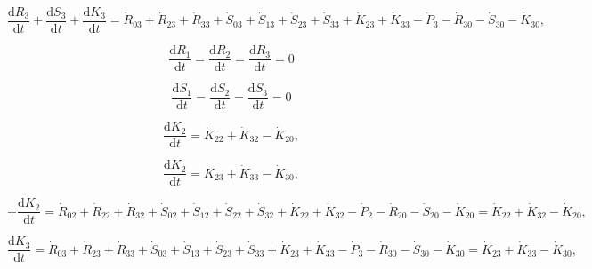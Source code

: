  \begin{equation} \label{eq:C-CV_R_dot_3}
 	\frac{\mathrm{d}R_{3}}{\mathrm{d}t} 
	+ \frac{\mathrm{d}S_{3}}{\mathrm{d}t}
 	+ \frac{\mathrm{d}K_{3}}{\mathrm{d}t}
 	=  \dot{R}_{03} + \dot{R}_{23} + \dot{R}_{33}
 	+ \dot{S}_{03} + \dot{S}_{13} + \dot{S}_{23} + \dot{S}_{33} 
 	+ \dot{K}_{23} + \dot{K}_{33}
 	- \dot{P}_{3}
 	- \dot{R}_{30} 
 	- \dot{S}_{30} 
 	- \dot{K}_{30},
 \end{equation}

\begin{equation}\label{eq:C-dR_dt_zero}
	\frac{\mathrm{d}R_{1}}{\mathrm{d}t} = \frac{\mathrm{d}R_{2}}{\mathrm{d}t} = \frac{\mathrm{d}R_{3}}{\mathrm{d}t} = 0
\end{equation}

\begin{equation}\label{eq:C-dS_dt_zero}
	\frac{\mathrm{d}S_{1}}{\mathrm{d}t} = \frac{\mathrm{d}S_{2}}{\mathrm{d}t} = \frac{\mathrm{d}S_{3}}{\mathrm{d}t} = 0
\end{equation}

\begin{equation} \label{eq:C-CV_K_dot_2}
	\frac{\mathrm{d}K_{2}}{\mathrm{d}t}
	=  \dot{K}_{22} + \dot{K}_{32} 
	- \dot{K}_{20},
\end{equation}

\begin{equation} \label{eq:C-CV_K_dot_3}
	\frac{\mathrm{d}K_{2}}{\mathrm{d}t}
	=  \dot{K}_{23} + \dot{K}_{33} 
	- \dot{K}_{30},
\end{equation}
 
 \begin{equation} \label{eq:C-CV_R_dot_2b}
 	+ \frac{\mathrm{d}K_{2}}{\mathrm{d}t}
 	=  \dot{R}_{02} + \dot{R}_{22} + \dot{R}_{32}
 	+ \dot{S}_{02} + \dot{S}_{12} + \dot{S}_{22} + \dot{S}_{32} 
 	+ \dot{K}_{22} + \dot{K}_{32}
 	- \dot{P}_{2}
 	- \dot{R}_{20} 
 	- \dot{S}_{20} 
 	- \dot{K}_{20}
	=  \dot{K}_{22} + \dot{K}_{32} 
	- \dot{K}_{20},
 \end{equation}
 
 \begin{equation} \label{eq:C-CV_R_dot_3}
 	\frac{\mathrm{d}K_{3}}{\mathrm{d}t}
 	=  \dot{R}_{03} + \dot{R}_{23} + \dot{R}_{33}
 	+ \dot{S}_{03} + \dot{S}_{13} + \dot{S}_{23} + \dot{S}_{33} 
 	+ \dot{K}_{23} + \dot{K}_{33}
 	- \dot{P}_{3}
 	- \dot{R}_{30} 
 	- \dot{S}_{30} 
 	- \dot{K}_{30}
	=  \dot{K}_{23} + \dot{K}_{33} 
	- \dot{K}_{30},
 \end{equation}


